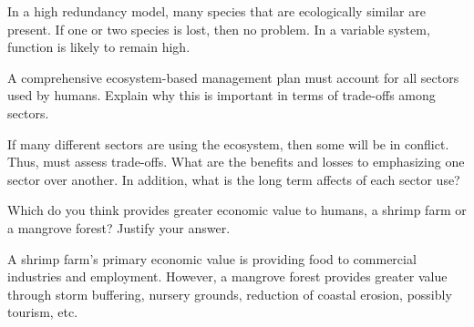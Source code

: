 \documentclass[12pt, addpoints]{exam}
\newcommand*\AnswerBox[2]{%
    \parbox[t][#1]{0.92\textwidth}{%
    \begin{solution}#2\end{solution}}
    \vspace{\stretch{1}}
}
\newenvironment{AnswerPage}[1]
    {\begin{minipage}[t][#1]{0.92\textwidth}%
    \begin{solution}}
    {\end{solution}\end{minipage}
    \vspace{\stretch{1}}}
\begin{document}
\begin{questions}
\begin{AnswerPage}{0.4\textheight}
	\vspace*{\baselineskip}
	
	In a high redundancy model, many species that are ecologically similar are present. If one or two species is lost, then no problem. In a variable system, function is likely to remain high.
	
	\end{AnswerPage}

\question[5]
A comprehensive ecosystem-based management plan must account for all sectors used by humans. Explain why this is important in terms of trade-offs among sectors.

	\AnswerBox{0.15\textheight}{%
	If many different sectors are using the ecosystem, then some will be in conflict. Thus, must assess trade-offs. What are the benefits and losses to emphasizing one sector over another. In addition, what is the long term affects of each sector use?
}

\question[5]
Which do you think provides greater economic value to humans, a shrimp farm or a mangrove forest? Justify your answer.

	\AnswerBox{0.15\textheight}{%
	A shrimp farm's primary economic value is providing food to commercial industries and employment. However, a mangrove forest provides greater value through storm buffering, nursery grounds, reduction of coastal erosion, possibly tourism, etc.
}



\end{questions}
\end{document}
